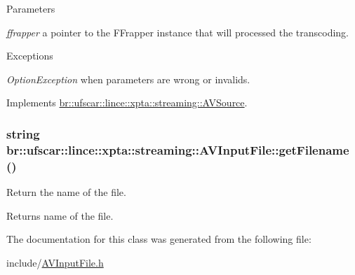 \begin{DoxyParams}{Parameters}
\item[{\em ffrapper}]a pointer to the FFrapper instance that will processed the transcoding. \end{DoxyParams}

\begin{DoxyExceptions}{Exceptions}
\item[{\em OptionException}]when parameters are wrong or invalids. \end{DoxyExceptions}


Implements \hyperlink{classbr_1_1ufscar_1_1lince_1_1xpta_1_1streaming_1_1AVSource_a35f8e70290dafd5ad952f54c3bc44ce3}{br::ufscar::lince::xpta::streaming::AVSource}.

\hypertarget{classbr_1_1ufscar_1_1lince_1_1xpta_1_1streaming_1_1AVInputFile_a3e3ebb2a99ae21d27a370c85fdf79741}{
\subsubsection[{getFilename}]{\setlength{\rightskip}{0pt plus 5cm}string br::ufscar::lince::xpta::streaming::AVInputFile::getFilename ()}}
\label{classbr_1_1ufscar_1_1lince_1_1xpta_1_1streaming_1_1AVInputFile_a3e3ebb2a99ae21d27a370c85fdf79741}


Return the name of the file. 

\begin{DoxyReturn}{Returns}
name of the file. 
\end{DoxyReturn}


The documentation for this class was generated from the following file:\begin{DoxyCompactItemize}
\item 
include/\hyperlink{AVInputFile_8h}{AVInputFile.h}\end{DoxyCompactItemize}
